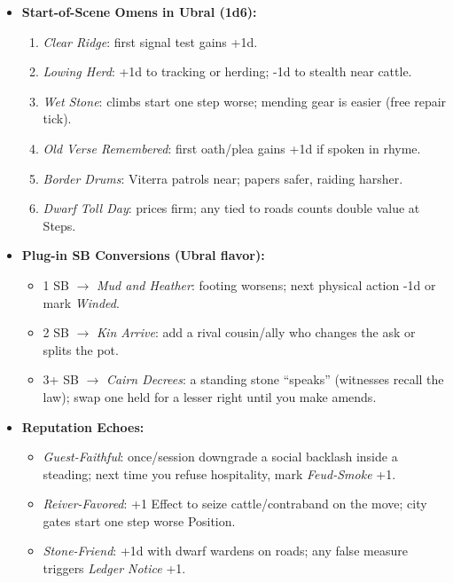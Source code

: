 \begin{itemize}
  \item \textbf{Start-of-Scene Omens in Ubral (1d6):}
  \begin{enumerate}
    \item \emph{Clear Ridge}: first signal test gains +1d.
    \item \emph{Lowing Herd}: +1d to tracking or herding; -1d to stealth near cattle.
    \item \emph{Wet Stone}: climbs start one step worse; mending gear is easier (free repair tick).
    \item \emph{Old Verse Remembered}: first oath/plea gains +1d if spoken in rhyme.
    \item \emph{Border Drums}: Viterra patrols near; papers safer, raiding harsher.
    \item \emph{Dwarf Toll Day}: prices firm; any \Diamond{} tied to roads counts double value at Steps.
  \end{enumerate}

  \item \textbf{Plug-in SB Conversions (Ubral flavor):}
  \begin{itemize}
    \item 1 SB \(\rightarrow\) \emph{Mud and Heather}: footing worsens; next physical action -1d or mark \emph{Winded}.
    \item 2 SB \(\rightarrow\) \emph{Kin Arrive}: add a rival cousin/ally who changes the ask or splits the pot.
    \item 3+ SB \(\rightarrow\) \emph{Cairn Decrees}: a standing stone “speaks” (witnesses recall the law); swap one held \Diamond{} for a lesser right until you make amends.
  \end{itemize}

  \item \textbf{Reputation Echoes:}
  \begin{itemize}
    \item \emph{Guest-Faithful}: once/session downgrade a social backlash inside a steading; next time you refuse hospitality, mark \emph{Feud-Smoke} +1.
    \item \emph{Reiver-Favored}: +1 Effect to seize cattle/contraband on the move; city gates start one step worse Position.
    \item \emph{Stone-Friend}: +1d with dwarf wardens on roads; any false measure triggers \emph{Ledger Notice} +1.
  \end{itemize}
\end{itemize}

